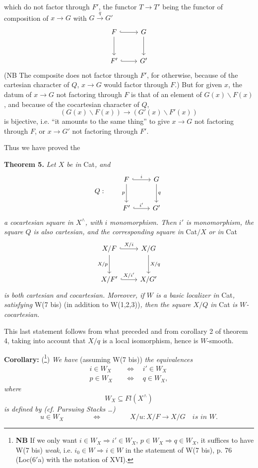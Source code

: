 \documentclass[11pt]{article}
\newcommand{\printedpage}[1]{\marginpar{\footnotesize p.~#1}}
\newcommand{\msp}[1]{\marginpar{\footnotesize [#1]}}
\begin{document}
\printedpage{113}
which do not factor through $F'$, the functor $T \longrightarrow T'$ being the functor of composition of $x \longrightarrow G$ with $G \xrightarrow{q} G'$
\[
\begin{tikzcd}[row sep=large]
F \arrow[r, hook] \arrow[d] & G \arrow[d] \\
F' \arrow[r, hook] & G'
\end{tikzcd}
\]
(NB The composite does not factor through $F'$, for otherwise, because of the cartesian character of $Q$, $x \longrightarrow G$ would factor through $F$.) But for given $x$, the datum of $x \longrightarrow G$ not factoring through $F$ is that of an element \msp{page 167} of $G(x)\backslash F(x)$, and because of the cocartesian character of $Q$,
\[
(G(x)\backslash F(x)) \longrightarrow (G'(x)\backslash F'(x))
\]
is bijective, i.e. ``it amounts to the same thing'' to give $x \longrightarrow G$ not factoring through $F$, or $x \longrightarrow G'$ not factoring through $F'$.

Thus we have proved the

\textbf{Theorem 5.} \textit{Let $X$ be in} Cat\textit{, and}
\[
Q : \qquad
\begin{tikzcd}[row sep=large, baseline=(current bounding box.center)]
F \arrow[r, hook, "i"] \arrow[d, "p"'] & G \arrow[d, "q"] \\
F' \arrow[r, hook, "i'"] & G'
\end{tikzcd}
\]
\textit{a cocartesian square in $X^\wedge$, with $i$} \textit{monomorphism. Then $i'$ is} \textit{monomorphism, the square $Q$ is also cartesian, and the corresponding square in} Cat$/X$ \textit{or in} Cat
\[
\begin{tikzcd}[row sep=large]
X/F \arrow[r, hook, "X/i"] \arrow[d, "X/p"'] & X/G \arrow[d, "X/q"] \\
X/F' \arrow[r, hook, "X/i'"] & X/G'
\end{tikzcd}
\]
\msp{page 168} \textit{is both cartesian and cocartesian. Moreover, if $W$ is a basic localizer in} Cat\textit{, satisfying} W(7 bis) (in addition to W(1,2,3))\textit{, then the square $X/Q$ in} Cat \textit{is $W$-cocartesian.}

\printedpage{114}
This last statement follows from what preceded and from corollary 2 of theorem 4, taking into account that $X/q$ is a local isomorphism, hence is $W$-smooth.

\textbf{Corollary:} (\footnote[111]{\textbf{NB} If we only want $i \in W_X \Longrightarrow i' \in W_X$, $p \in W_X \Longrightarrow q \in W_X$, it suffices to have W(7 bis) \textit{weak}, i.e. $i_0 \in W \Longrightarrow i \in W$ in the statement of W(7 bis), p. 76 (Loc(6$'$a) with the notation of XVI).}) \textit{We have} (assuming W(7 bis)) \textit{the equivalences}
\[
\begin{aligned}
i \in W_X \quad &\Longleftrightarrow \quad i' \in W_X \\
p \in W_X \quad &\Longleftrightarrow \quad q \in W_X,
\end{aligned}
\]
\textit{where}
\[
W_X \subseteq \mathit{Fl}(X^\wedge)
\]
\textit{is defined by (cf. Pursuing Stacks \ldots)}
\[
u \in W_X \qquad\qquad \Longleftrightarrow \qquad\qquad X/u : X/F \longrightarrow X/G \quad \textit{is in } W.
\]
\end{document}
